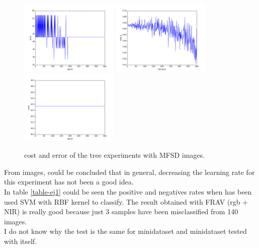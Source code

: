 \begin{figure}[htb]
\includegraphics[width=0.42\textwidth]{images/redes/ejecucion1/general_svm_mfsd/minidataset_tested_itself/error.png}
\includegraphics[width=0.42\textwidth]{images/redes/ejecucion1/general_svm_mfsd/minidataset_tested_iteself_lr_0_001/cost.png}
\includegraphics[width=0.42\textwidth]{images/redes/ejecucion1/general_svm_mfsd/minidataset_tested_iteself_lr_0_001/error.png}
\caption{cost and error of the tree experiments with MFSD images.} \label{fig:mfsd-ejec1}
\end{figure}

From images, could be concluded that in general, decreasing the learning rate for this experiment has not been a good idea.\\

In table \ref{table-ej1} could be seen the positive and negatives rates when has been used SVM with RBF kernel to classify. The result obtained with FRAV (rgb + NIR) is really good because just 3 samples have been misclassified from 140 images.\\

I do not know why the test is the same for minidataset and minidataset tested with itself.\\

